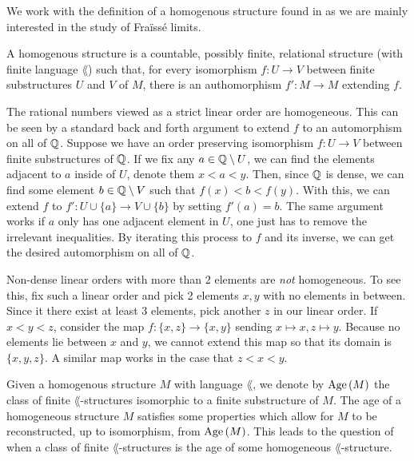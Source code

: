 \documentclass[../main.tex]{subfiles}
\begin{document}
We work with the definition of a homogenous structure found in \cite{macpherson11} as we are
mainly interested in the study of Fraïssé limits.

\begin{defn}
  A homogenous structure is a countable, possibly finite, relational structure (with finite
  language $\lang$) such that, for every isomorphism $f : U \to V$ between finite substructures $U$
  and $V$ of $M$, there is an authomorphism $f' : M \to M$ extending $f$.
\end{defn}

\begin{exmp}
  The rational numbers viewed as a strict linear order are homogeneous. This can be seen by a
  standard back and forth argument to extend $f$ to an automorphism on all of $\mathbb{Q}$. Suppose
  we have an order preserving isomorphism $f : U \to V$ between finite substructures of $\mathbb{Q}$. If
  we fix any $a \in \mathbb{Q} \setminus U$, we can find the elements adjacent to $a$ inside of $U$,
  denote them $x < a < y$. Then, since $\mathbb{Q}$ is dense, we can find some element
  $b \in \mathbb{Q} \setminus V$ such that $f(x) < b < f(y)$. With this, we can extend $f$ to
  $f' : U \cup \{a\} \to V \cup \{b\}$ by setting $f'(a)=b$. The same argument works if
  $a$ only has one adjacent element in $U$, one just has to remove the irrelevant inequalities.
  By iterating this process to $f$ and its inverse, we can get the desired automorphism on all of
  $\mathbb{Q}$.
\end{exmp}

\begin{exmp}
  Non-dense linear orders with more than 2 elements are \textit{not} homogeneous. To see this,
  fix such a linear order and pick 2  elements $x,y$ with no elements in between. Since it there
  exist at least 3 elements, pick another $z$ in our linear order. If $x < y < z$, consider
  the map $f : \{x,z\} \to \{x,y\}$ sending $x \mapsto x, z \mapsto y$. Because no elements lie
  between $x$ and $y$, we cannot extend this map so that its domain is $\{x,y,z\}$. A similar
  map works in the case that $z < x < y$.
\end{exmp}

Given a homogenous structure $M$ with language $\lang$, we denote by $\text{Age}\left(M\right)$ the class of finite
$\lang$-structures isomorphic to a finite substructure of $M$. The age of a homogeneous structure
$M$ satisfies some properties which allow for $M$ to be reconstructed, up to isomorphism, from
$\text{Age}\left(M\right)$. This leads to the question of when a class of finite $\lang$-structures is the age of some
homogeneous $\lang$-structure.
\end{document}
